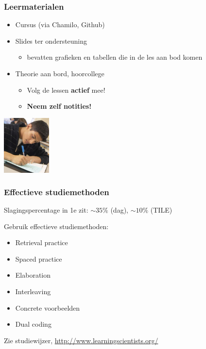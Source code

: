 \documentclass[aspectratio=169]{beamer}
\begin{document}
\begin{frame}
  \frametitle{Leermaterialen}

  \begin{itemize}
    \item Cursus (via Chamilo, Github)
    \item Slides ter ondersteuning
      \begin{itemize}
        \item bevatten grafieken en tabellen die in de les aan bod komen
      \end{itemize}
    \item Theorie aan bord, hoorcollege
      \begin{itemize}
        \item Volg de lessen \textbf{actief} mee!
        \item \textbf{Neem zelf notities!}
      \end{itemize}
  \end{itemize}


  \begin{center}
    \includegraphics[height=3cm]{img/intro-06.jpg}
  \end{center}

\end{frame}

\begin{frame}
  \frametitle{Effectieve studiemethoden}
  
  Slagingspercentage in 1e zit: $\sim35\%$ (dag), $\sim10\%$ (TILE)
  
  \vspace{8pt}
  
  Gebruik effectieve studiemethoden:
  
  \begin{itemize}
    \item Retrieval practice
    \item Spaced practice
    \item Elaboration
    \item Interleaving
    \item Concrete voorbeelden
    \item Dual coding
  \end{itemize}

  Zie studiewijzer, \url{http://www.learningscientists.org/}
  
\end{frame}
\end{document}
